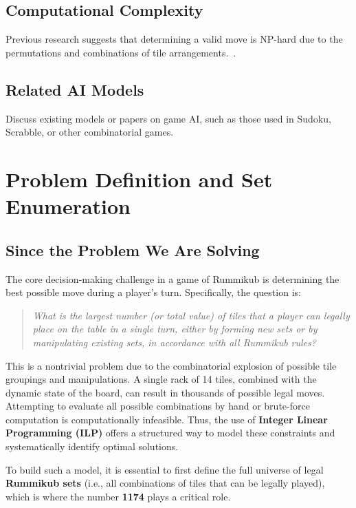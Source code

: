 \documentclass[12pt]{article}
\begin{document}
\subsection{Computational Complexity}
Previous research suggests that determining a valid move is NP-hard due to the permutations and combinations of tile arrangements.~\cite{rummikub_complexity}.


\subsection{Related AI Models}
Discuss existing models or papers on game AI, such as those used in Sudoku, Scrabble, or other combinatorial games.

\section{Problem Definition and Set Enumeration}

\subsection{Since the Problem We Are Solving}

The core decision-making challenge in a game of Rummikub is determining the best possible move during a player's turn. Specifically, the question is:

\begin{quote}
    \emph{What is the largest number (or total value) of tiles that a player can legally place on the table in a single turn, either by forming new sets or by manipulating existing sets, in accordance with all Rummikub rules?}
\end{quote}

This is a nontrivial problem due to the combinatorial explosion of possible tile groupings and manipulations. A single rack of 14 tiles, combined with the dynamic state of the board, can result in thousands of possible legal moves. Attempting to evaluate all possible combinations by hand or brute-force computation is computationally infeasible. Thus, the use of \textbf{Integer Linear Programming (ILP)} offers a structured way to model these constraints and systematically identify optimal solutions.

To build such a model, it is essential to first define the full universe of legal \textbf{Rummikub sets} (i.e., all combinations of tiles that can be legally played), which is where the number \textbf{1174} plays a critical role.
\end{document}
